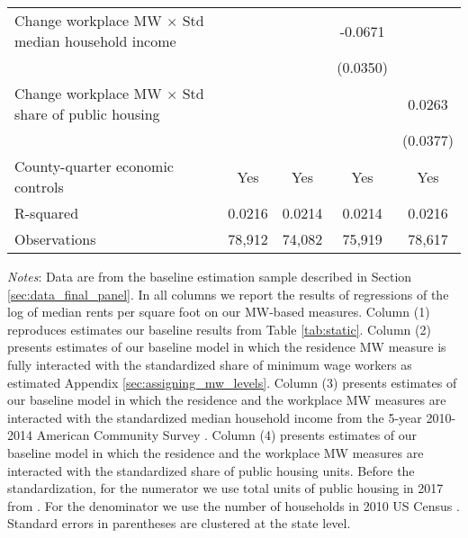 \begin{table}[hbt!]
\begin{tabular}{@{}lcccc@{}}
        Change workplace MW $\times$ Std median household income&        &       &  -0.0671   &        \\
                                                                &        &       & (0.0350)  &        \\
        Change workplace MW $\times$ Std share of public housing&        &       &        &  0.0263   \\
                                                                &        &       &        & (0.0377)  \\
        County-quarter economic controls                        &  Yes   &  Yes  &   Yes  &  Yes   \\
        R-squared                                               &  0.0216   &  0.0214  &   0.0214  &  0.0216   \\
        Observations                                            &  78,912  &  74,082 &   75,919 &  78,617  \\ \bottomrule
    \end{tabular}

    \begin{minipage}{.95\textwidth} \footnotesize
        \vspace{2mm}
        \textit{Notes}: 
        Data are from the baseline estimation sample described in Section 
        \ref{sec:data_final_panel}.
        In all columns we report the results of regressions of the log of median rents 
        per square foot on our MW-based measures.
        Column (1) reproduces estimates our baseline results from Table \ref{tab:static}.
        Column (2) presents estimates of our baseline model in which the residence MW 
        measure is fully interacted with the standardized share of minimum wage workers as 
        estimated Appendix \ref{sec:assigning_mw_levels}.
        Column (3) presents estimates of our baseline model in which the residence and 
        the workplace MW measures are interacted with the standardized median household income 
        from the 5-year 2010-2014 American Community Survey \parencite[ACS;][]{CensusACS}.
        Column (4) presents estimates of our baseline model in which the residence and 
        the workplace MW measures are interacted with the standardized share of public housing 
        units. Before the standardization, for the numerator we use total units of public 
        housing in 2017 from \textcite{hudHousing}. For the denominator we use the number of 
        households in 2010 US Census \parencite{CensusDecennial}.
        Standard errors in parentheses are clustered at the state level.
    \end{minipage}
\end{table}
